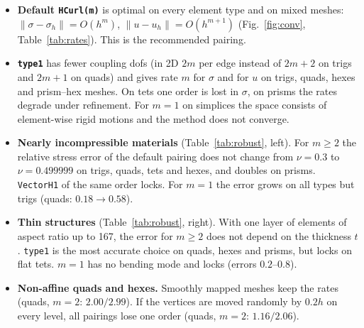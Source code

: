 \documentclass[10pt,a4paper]{article}
\newcommand{\code}[1]{\texttt{#1}}
\begin{document}
\begin{itemize}\setlength\itemsep{1pt}
\item \textbf{Default \code{HCurl(m)}} is optimal on every element type and on mixed meshes: $\|\sigma-\sigma_h\|=O(h^m)$, $\|u-u_h\|=O(h^{m+1})$ (Fig.~\ref{fig:conv}, Table~\ref{tab:rates}). This is the recommended pairing.
\item \textbf{\code{type1}} has fewer coupling dofs (in 2D $2m$ per edge instead of $2m+2$ on trigs and $2m+1$ on quads) and gives rate $m$ for $\sigma$ and for $u$ on trigs, quads, hexes and prism--hex meshes. On tets one order is lost in $\sigma$, on prisms the rates degrade under refinement. For $m=1$ on simplices the space consists of element-wise rigid motions and the method does not converge.
\item \textbf{Nearly incompressible materials} (Table~\ref{tab:robust}, left). For $m\ge2$ the relative stress error of the default pairing does not change from $\nu=0.3$ to $\nu=0.499999$ on trigs, quads, tets and hexes, and doubles on prisms. \code{VectorH1} of the same order locks. For $m=1$ the error grows on all types but trigs (quads: $0.18\to0.58$).
\item \textbf{Thin structures} (Table~\ref{tab:robust}, right). With one layer of elements of aspect ratio up to 167, the error for $m\ge2$ does not depend on the thickness $t$. \code{type1} is the most accurate choice on quads, hexes and prisms, but locks on flat tets. $m=1$ has no bending mode and locks (errors $0.2$--$0.8$).
\item \textbf{Non-affine quads and hexes.} Smoothly mapped meshes keep the rates (quads, $m=2$: $2.00/2.99$). If the vertices are moved randomly by $0.2h$ on every level, all pairings lose one order (quads, $m=2$: $1.16/2.06$).
\end{itemize}
\end{document}
